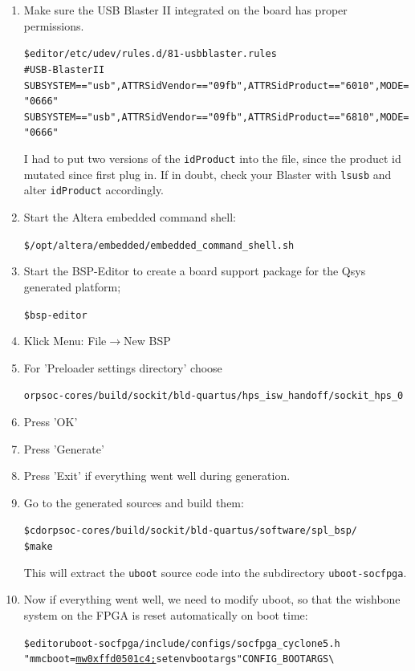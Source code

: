\documentclass[twoside]{article}
\newcommand{\M}{$\rightarrow$}
\begin{document}
\begin{enumerate}
\item Make sure the USB Blaster II integrated on the board has proper
  permissions. 
  \begin{alltt}
\$ editor /etc/udev/rules.d/81-usbblaster.rules   
\hrulefill
# USB-Blaster II
SUBSYSTEM=="usb", ATTRS{idVendor}=="09fb", ATTRS{idProduct}=="6010", MODE="0666"
SUBSYSTEM=="usb", ATTRS{idVendor}=="09fb", ATTRS{idProduct}=="6810", MODE="0666"
\hrulefill
  \end{alltt}

  I had to put two versions of the \texttt{idProduct} into the file,
  since the product id mutated since first plug in. If in doubt, check
  your Blaster with \texttt{lsusb} and alter \texttt{idProduct}
  accordingly.

\item Start the Altera embedded command shell:
  \begin{alltt}
\$ /opt/altera/embedded/embedded_command_shell.sh
  \end{alltt}

\item Start the BSP-Editor to create a board support package for the
  Qsys generated platform;
  \begin{alltt}
\$ bsp-editor   
  \end{alltt}

\item Klick Menu: File\M New BSP

\item For 'Preloader settings directory' choose

  \texttt{orpsoc-cores/build/sockit/bld-quartus/hps\_isw\_handoff/sockit\_hps\_0}

\item Press 'OK'

\item Press 'Generate'

\item Press 'Exit' if everything went well during generation.

\item Go to the generated sources and build them:
  \begin{alltt}
\$ cd orpsoc-cores/build/sockit/bld-quartus/software/spl_bsp/    
\$ make
  \end{alltt}
  This will extract the \texttt{uboot} source code into the
  subdirectory \texttt{uboot-socfpga}.

\item Now if everything went well, we need to modify uboot, so that
  the wishbone system on the FPGA is reset automatically on boot time:
  \begin{alltt}
\$ editor uboot-socfpga/include/configs/socfpga_cyclone5.h
\hrulefill
    "mmcboot=\underline{mw 0xffd0501c 4;}setenv bootargs " CONFIG_BOOTARGS \textbackslash
\hrulefill
  \end{alltt}


\end{enumerate}
\end{document}
